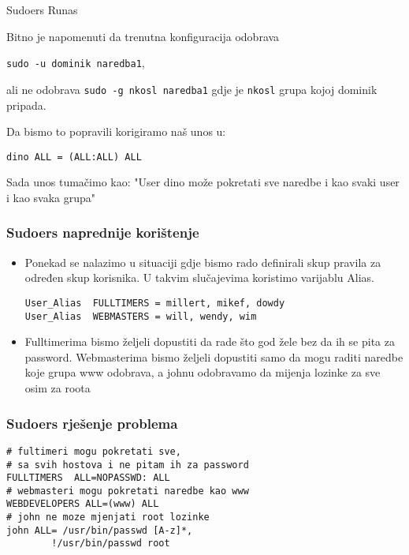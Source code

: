 \documentclass[table,usenames,dvipsnames] {beamer}
\newcommand{\shell}[1]{\texttt{#1}}
\begin{document}
\begin{frame} {Sudoers Runas}

Bitno je napomenuti da trenutna konfiguracija odobrava 

\shell{sudo -u dominik naredba1},

 ali ne odobrava \shell{sudo -g nkosl naredba1} gdje je \shell{nkosl} grupa kojoj dominik pripada.
 
Da bismo to popravili korigiramo naš unos u:

\shell{dino ALL = (ALL:ALL) ALL}

Sada unos tumačimo kao: "User dino može pokretati sve naredbe i kao svaki user i kao svaka grupa"
\end{frame}

\begin{frame}[fragile]
\frametitle{Sudoers naprednije korištenje}
\begin{itemize}
\item Ponekad se nalazimo u situaciji gdje bismo rado definirali skup pravila za određen skup korisnika. U takvim slučajevima koristimo varijablu Alias.
\begin{lstlisting}
User_Alias	FULLTIMERS = millert, mikef, dowdy
User_Alias	WEBMASTERS = will, wendy, wim
\end{lstlisting}

\item Fulltimerima bismo željeli dopustiti da rade što god žele bez da ih se pita za password. Webmasterima bismo željeli dopustiti samo da mogu raditi naredbe koje grupa www odobrava, a johnu odobravamo da mijenja lozinke za sve osim za roota
\end{itemize}
\end{frame}

\begin{frame}[fragile]
\frametitle{Sudoers rješenje problema}
\begin{lstlisting}
# fultimeri mogu pokretati sve, 
# sa svih hostova i ne pitam ih za password
FULLTIMERS	ALL=NOPASSWD: ALL
# webmasteri mogu pokretati naredbe kao www
WEBDEVELOPERS ALL=(www) ALL
# john ne moze mjenjati root lozinke
john ALL= /usr/bin/passwd [A-z]*, 
		!/usr/bin/passwd root
\end{lstlisting}
\end{frame}
\end{document}
